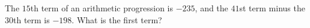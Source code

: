 The $15$th term of an arithmetic progression is $-235$, and the $41$st term minus the $30$th term is $-198$. What is the first term?
